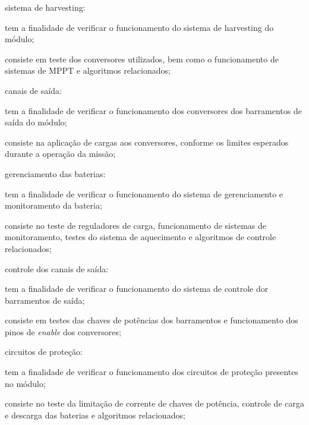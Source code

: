 \begin{alineas}
    \item sistema de harvesting:
    \begin{alineas}
        \item tem a finalidade de verificar o funcionamento do sistema de harvesting do módulo;
        \item consiste em teste dos conversores utilizados, bem como o funcionamento de sistemas de \gls{MPPT} e algoritmos relacionados;
    \end{alineas}

    \item canais de saída:
    \begin{alineas}
        \item tem a finalidade de verificar o funcionamento dos conversores dos barramentos de saída do módulo;
        \item consiste na aplicação de cargas aos conversores, conforme os limites esperados durante a operação da missão;
    \end{alineas}

    \item gerenciamento das baterias:
    \begin{alineas}
        \item tem a finalidade de verificar o funcionamento do sistema de gerenciamento e monitoramento da bateria;
        \item consiste no teste de reguladores de carga, funcionamento de sistemas de monitoramento, testes do sistema de aquecimento e algoritmos de controle relacionados;
    \end{alineas}

    \item controle dos canais de saída:
    \begin{alineas}
        \item tem a finalidade de verificar o funcionamento do sistema de controle dor barramentos de saída;
        \item consiste em testes das chaves de potências dos barramentos e funcionamento dos pinos de \textit{enable} dos conversores;
    \end{alineas}

    \item circuitos de proteção:
    \begin{alineas}
        \item tem a finalidade de verificar o funcionamento dos circuitos de proteção presentes no módulo;
        \item consiste no teste da limitação de corrente de chaves de potência, controle de carga e descarga das baterias e algoritmos relacionados;
    \end{alineas}


\end{alineas}
